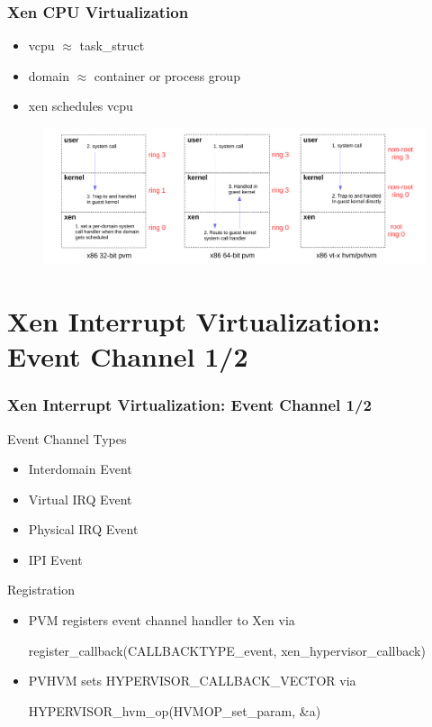 \documentclass[aspectratio=169]{beamer}
\begin{document}

\begin{frame}
\frametitle{Xen CPU Virtualization}
\begin{itemize}
\item vcpu $ \approx $ task\_struct
\item domain $ \approx $ container or process group
\item xen schedules vcpu
\end{itemize}
\begin{figure}
\includegraphics[width=1.0\linewidth]{figures/cpu.pdf}
\end{figure}
\end{frame}


\section{Xen Interrupt Virtualization: Event Channel 1/2}
\begin{frame}
\frametitle{Xen Interrupt Virtualization: Event Channel 1/2}
\begin{block}{Event Channel Types}
\begin{itemize}
\item Interdomain Event
\item Virtual IRQ Event
\item Physical IRQ Event
\item IPI Event
\end{itemize}
\end{block}
\begin{block}{Registration}
\begin{itemize}
\item PVM registers event channel handler to Xen via 

register\_callback(CALLBACKTYPE\_event, xen\_hypervisor\_callback)

\item PVHVM sets HYPERVISOR\_CALLBACK\_VECTOR via

HYPERVISOR\_hvm\_op(HVMOP\_set\_param, \&a)
\end{itemize}
\end{block}

\end{frame}
\end{document}

